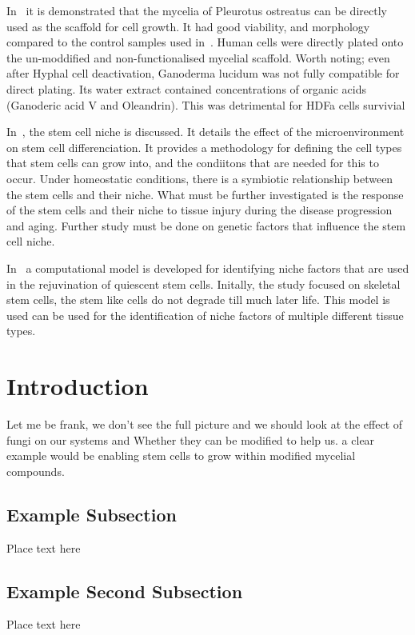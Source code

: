\documentclass[twoside,twocolumn,10pt]{article}
\begin{document}
In~\cite{Antinori2021Mycelium} it is demonstrated that the mycelia of Pleurotus ostreatus can be directly used as the scaffold for cell growth.
It had good viability, and morphology compared to the control samples used in~\cite{Antinori2021Mycelium}. Human cells were directly plated onto the un-moddified and non-functionalised mycelial scaffold. 
Worth noting; even after Hyphal cell deactivation, Ganoderma lucidum was not fully compatible for direct plating. 
Its water extract contained concentrations of organic acids (Ganoderic acid V and Oleandrin). 
This was detrimental for HDFa cells survivial

In~\cite{Voog2010NicheStemCells}, the stem cell niche is discussed. It details the effect of the microenvironment on stem cell differenciation.
It provides a methodology for defining the cell types that stem cells can grow into, and the condiitons that are needed for this to occur.
Under homeostatic conditions, there is a symbiotic relationship between the stem cells and their niche. 
What must be further investigated is the response of the stem cells and their niche to tissue injury during the disease progression and aging. 
Further study must be done on genetic factors that influence the stem cell niche. 

In~\cite{potapov2022computational} a computational model is developed for identifying niche factors that are used in the rejuvination of quiescent stem cells.
Initally, the study focused on skeletal stem cells, the stem like cells do not degrade till much later life.
This model is used can be used for the identification of niche factors of multiple different tissue types.

\section{Introduction}
\fontsize{12}{14}\selectfont
Let me be frank, we don't see the full picture and we should look at the effect of fungi on our systems and 
Whether they can be modified to help us. 
a clear example would be enabling stem cells to grow within modified mycelial compounds.

\subsection{Example Subsection}
\fontsize{12}{14}\selectfont
Place text here

\subsection{Example Second Subsection}
\fontsize{12}{14}\selectfont
Place text here
\end{document}
